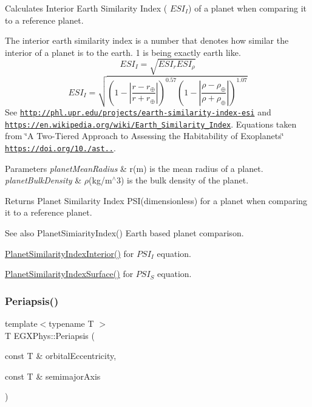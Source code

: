 Calculates Interior Earth Similarity Index ( $ESI_I$) of a planet when comparing it to a reference planet. 

The interior earth similarity index is a number that denotes how similar the interior of a planet is to the earth. 1 is being exactly earth like. \[ESI_I=\sqrt{ESI_r ESI_\rho}\] \[ESI_I=\sqrt{\left ( 1 - \left | \frac{r-r_\oplus}{r+r_\oplus} \right | \right )^{0.57} \left ( 1 - \left | \frac{\rho-\rho_\oplus}{\rho+\rho_\oplus} \right | \right )^{1.07}}\] See \href{http://phl.upr.edu/projects/earth-similarity-index-esi}{\tt http\+://phl.\+upr.\+edu/projects/earth-\/similarity-\/index-\/esi} and \href{https://en.wikipedia.org/wiki/Earth_Similarity_Index}{\tt https\+://en.\+wikipedia.\+org/wiki/\+Earth\+\_\+\+Similarity\+\_\+\+Index}. Equations taken from \char`\"{}\+A Two-\/\+Tiered Approach to Assessing the Habitability of Exoplanets\char`\"{} \href{https://doi.org/10.1089/ast.2010.0592}{\tt https\+://doi.\+org/10./ast..}.


\begin{DoxyParams}{Parameters}
{\em planet\+Mean\+Radius} & r(m) is the mean radius of a planet. \\
\hline
{\em planet\+Bulk\+Density} & $\rho$(kg/m$^\wedge$3) is the bulk density of the planet. \\
\hline
\end{DoxyParams}
\begin{DoxyReturn}{Returns}
Planet Similarity Index P\+S\+I(dimensionless) for a planet when comparing it to a reference planet. 
\end{DoxyReturn}
\begin{DoxySeeAlso}{See also}
Planet\+Simiarity\+Index() Earth based planet comparison. 

\hyperlink{group___astrophysics_ga6dc06a1a8baf6e132abed51fcf410c7f}{Planet\+Similarity\+Index\+Interior()} for $PSI_I$ equation. 

\hyperlink{group___astrophysics_gae0c7dce2779d66b0560ca388a34ddc39}{Planet\+Similarity\+Index\+Surface()} for $PSI_S$ equation. 
\end{DoxySeeAlso}
\mbox{\label{group___astrophysics_ga4414ac75539371ec874a3d25cad6c9fe}} 
\subsubsection{\texorpdfstring{Periapsis()}{Periapsis()}}
{\footnotesize\ttfamily template$<$typename T $>$ \\
T E\+G\+X\+Phys\+::\+Periapsis (\begin{DoxyParamCaption}\item[{const T \&}]{orbital\+Eccentricity,  }\item[{const T \&}]{semimajor\+Axis }\end{DoxyParamCaption})}



